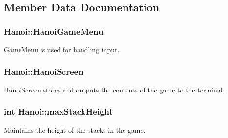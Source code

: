 \subsection{Member Data Documentation}
\hypertarget{classHanoi_a7d73005d59c4f2134ffd564964ab3f49}{
\subsubsection[{Hanoi\-Game\-Menu}]{ Hanoi\-::\-Hanoi\-Game\-Menu\hspace{0.3cm}{\ttfamily [private]}}}\label{classHanoi_a7d73005d59c4f2134ffd564964ab3f49}


\hyperlink{classGameMenu}{Game\-Menu} is used for handling input. 

\hypertarget{classHanoi_a1b9bfd6a0428f772d78b66a5a3268c4c}{
\subsubsection[{Hanoi\-Screen}]{ Hanoi\-::\-Hanoi\-Screen\hspace{0.3cm}{\ttfamily [private]}}}\label{classHanoi_a1b9bfd6a0428f772d78b66a5a3268c4c}


Hanoi\-Screen stores and outputs the contents of the game to the terminal. 

\hypertarget{classHanoi_a826f3bc786cb5c7b6499508d0b8bc9b4}{
\subsubsection[{max\-Stack\-Height}]{\setlength{\rightskip}{0pt plus 5cm}int Hanoi\-::max\-Stack\-Height\hspace{0.3cm}{\ttfamily [private]}}}\label{classHanoi_a826f3bc786cb5c7b6499508d0b8bc9b4}


Maintains the height of the stacks in the game. 

